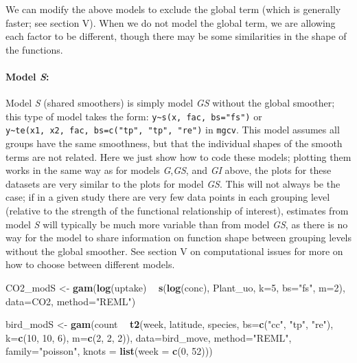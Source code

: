 \documentclass[12pt]{article}
\newenvironment{Shaded}{\begin{snugshade}}{\end{snugshade}}
\newcommand{\KeywordTok}[1]{\textcolor[rgb]{0.13,0.29,0.53}{\textbf{#1}}}
\newcommand{\DataTypeTok}[1]{\textcolor[rgb]{0.13,0.29,0.53}{#1}}
\newcommand{\DecValTok}[1]{\textcolor[rgb]{0.00,0.00,0.81}{#1}}
\newcommand{\StringTok}[1]{\textcolor[rgb]{0.31,0.60,0.02}{#1}}
\newcommand{\OperatorTok}[1]{\textcolor[rgb]{0.81,0.36,0.00}{\textbf{#1}}}
\newcommand{\NormalTok}[1]{#1}
\let\oldparagraph\paragraph
\renewcommand{\paragraph}[1]{\oldparagraph{#1}\mbox{}}
\begin{document}
We can modify the above models to exclude the global term (which is
generally faster; see section V). When we do not model the global term,
we are allowing each factor to be different, though there may be some
similarities in the shape of the functions.

\paragraph{\texorpdfstring{Model \emph{S}:}{Model S:}}\label{model-s}

Model \emph{S} (shared smoothers) is simply model \emph{GS} without the
global smoother; this type of model takes the form:
\texttt{y\textasciitilde{}s(x,\ fac,\ bs="fs")} or
\texttt{y\textasciitilde{}te(x1,\ x2,\ fac,\ bs=c("tp",\ "tp",\ "re")}
in \texttt{mgcv}. This model assumes all groups have the same
smoothness, but that the individual shapes of the smooth terms are not
related. Here we just show how to code these models; plotting them works
in the same way as for models \emph{G},\emph{GS}, and \emph{GI} above,
the plots for these datasets are very similar to the plots for model
\emph{GS}. This will not always be the case; if in a given study there
are very few data points in each grouping level (relative to the
strength of the functional relationship of interest), estimates from
model \emph{S} will typically be much more variable than from model
\emph{GS}, as there is no way for the model to share information on
function shape between grouping levels without the global smoother. See
section V on computational issues for more on how to choose between
different models.

\begin{Shaded}
\begin{Highlighting}[]
\NormalTok{CO2_modS <-}\StringTok{ }\KeywordTok{gam}\NormalTok{(}\KeywordTok{log}\NormalTok{(uptake) }\OperatorTok{~}\StringTok{ }\KeywordTok{s}\NormalTok{(}\KeywordTok{log}\NormalTok{(conc), Plant_uo, }\DataTypeTok{k=}\DecValTok{5}\NormalTok{, }\DataTypeTok{bs=}\StringTok{"fs"}\NormalTok{, }\DataTypeTok{m=}\DecValTok{2}\NormalTok{),}
                \DataTypeTok{data=}\NormalTok{CO2, }\DataTypeTok{method=}\StringTok{"REML"}\NormalTok{)}

\NormalTok{bird_modS <-}\StringTok{ }\KeywordTok{gam}\NormalTok{(count }\OperatorTok{~}\StringTok{ }\KeywordTok{t2}\NormalTok{(week, latitude, species, }\DataTypeTok{bs=}\KeywordTok{c}\NormalTok{(}\StringTok{"cc"}\NormalTok{, }\StringTok{"tp"}\NormalTok{, }\StringTok{"re"}\NormalTok{),}
                            \DataTypeTok{k=}\KeywordTok{c}\NormalTok{(}\DecValTok{10}\NormalTok{, }\DecValTok{10}\NormalTok{, }\DecValTok{6}\NormalTok{), }\DataTypeTok{m=}\KeywordTok{c}\NormalTok{(}\DecValTok{2}\NormalTok{, }\DecValTok{2}\NormalTok{, }\DecValTok{2}\NormalTok{)),}
                 \DataTypeTok{data=}\NormalTok{bird_move, }\DataTypeTok{method=}\StringTok{"REML"}\NormalTok{, }\DataTypeTok{family=}\StringTok{"poisson"}\NormalTok{,}
                 \DataTypeTok{knots =} \KeywordTok{list}\NormalTok{(}\DataTypeTok{week =} \KeywordTok{c}\NormalTok{(}\DecValTok{0}\NormalTok{, }\DecValTok{52}\NormalTok{)))}
\end{Highlighting}
\end{Shaded}
\end{document}
